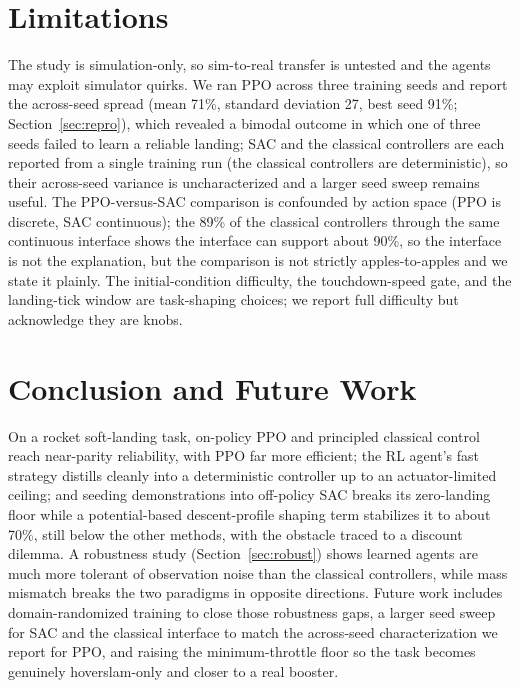 \documentclass[10pt,twocolumn]{article}
\begin{document}
\section{Limitations}

The study is simulation-only, so sim-to-real transfer is untested and the agents may exploit simulator quirks. We ran PPO across three training seeds and report the across-seed spread (mean 71\%, standard deviation 27, best seed 91\%; Section~\ref{sec:repro}), which revealed a bimodal outcome in which one of three seeds failed to learn a reliable landing; SAC and the classical controllers are each reported from a single training run (the classical controllers are deterministic), so their across-seed variance is uncharacterized and a larger seed sweep remains useful. The PPO-versus-SAC comparison is confounded by action space (PPO is discrete, SAC continuous); the 89\% of the classical controllers through the same continuous interface shows the interface can support about 90\%, so the interface is not the explanation, but the comparison is not strictly apples-to-apples and we state it plainly. The initial-condition difficulty, the touchdown-speed gate, and the landing-tick window are task-shaping choices; we report full difficulty but acknowledge they are knobs.

\section{Conclusion and Future Work}

On a rocket soft-landing task, on-policy PPO and principled classical control reach near-parity reliability, with PPO far more efficient; the RL agent's fast strategy distills cleanly into a deterministic controller up to an actuator-limited ceiling; and seeding demonstrations into off-policy SAC breaks its zero-landing floor while a potential-based descent-profile shaping term stabilizes it to about 70\%, still below the other methods, with the obstacle traced to a discount dilemma. A robustness study (Section~\ref{sec:robust}) shows learned agents are much more tolerant of observation noise than the classical controllers, while mass mismatch breaks the two paradigms in opposite directions. Future work includes domain-randomized training to close those robustness gaps, a larger seed sweep for SAC and the classical interface to match the across-seed characterization we report for PPO, and raising the minimum-throttle floor so the task becomes genuinely hoverslam-only and closer to a real booster.
\end{document}
